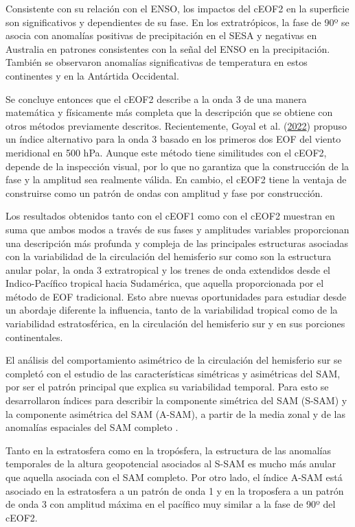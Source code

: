 \documentclass[12pt,oneside,a4paper]{reedthesis}
\begin{document}
Consistente con su relación con el ENSO, los impactos del cEOF2 en la superficie son significativos y dependientes de su fase.
En los extratrópicos, la fase de 90º se asocia con anomalías positivas de precipitación en el SESA y negativas en Australia en patrones consistentes con la señal del ENSO en la precipitación.
También se observaron anomalías significativas de temperatura en estos continentes y en la Antártida Occidental.

Se concluye entonces que el cEOF2 describe a la onda 3 de una manera matemática y físicamente más completa que la descripción que se obtiene con otros métodos previamente descritos.
Recientemente, Goyal et al. (\protect\hyperlink{ref-goyal2022}{2022}) propuso un índice alternativo para la onda 3 basado en los primeros dos EOF del viento meridional en 500 hPa.
Aunque este método tiene similitudes con el cEOF2, depende de la inspección visual, por lo que no garantiza que la construcción de la fase y la amplitud sea realmente válida.
En cambio, el cEOF2 tiene la ventaja de construirse como un patrón de ondas con amplitud y fase por construcción.

Los resultados obtenidos tanto con el cEOF1 como con el cEOF2 muestran en suma que ambos modos a través de sus fases y amplitudes variables proporcionan una descripción más profunda y compleja de las principales estructuras asociadas con la variabilidad de la circulación del hemisferio sur como son la estructura anular polar, la onda 3 extratropical y los trenes de onda extendidos desde el Indico-Pacífico tropical hacia Sudamérica, que aquella proporcionada por el método de EOF tradicional.
Esto abre nuevas oportunidades para estudiar desde un abordaje diferente la influencia, tanto de la variabilidad tropical como de la variabilidad estratosférica, en la circulación del hemisferio sur y en sus porciones continentales.

El análisis del comportamiento asimétrico de la circulación del hemisferio sur se completó con el estudio de las características simétricas y asimétricas del SAM, por ser el patrón principal que explica su variabilidad temporal.
Para esto se desarrollaron índices para describir la componente simétrica del SAM (S-SAM) y la componente asimétrica del SAM (A-SAM), a partir de la media zonal y de las anomalías espaciales del SAM completo .

Tanto en la estratosfera como en la tropósfera, la estructura de las anomalías temporales de la altura geopotencial asociados al S-SAM es mucho más anular que aquella asociada con el SAM completo.
Por otro lado, el índice A-SAM está asociado en la estratosfera a un patrón de onda 1 y en la troposfera a un patrón de onda 3 con amplitud máxima en el pacífico muy similar a la fase de 90º del cEOF2.
\end{document}

